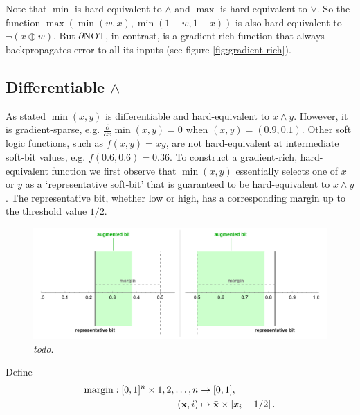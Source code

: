 \documentclass{article} %
\begin{document}
Note that $\operatorname{min}$ is hard-equivalent to $\wedge$ and $\operatorname{max}$ is hard-equivalent to $\vee$. So the function $\operatorname{max}(\operatorname{min}(w, x), \operatorname{min}(1-w, 1-x))$ is also hard-equivalent to $\neg(x \oplus w)$. But $\partial\text{NOT}$, in contrast, is a gradient-rich function that always backpropagates error to all its inputs (see figure \ref{fig:gradient-rich}).

\subsection{Differentiable $\wedge$}

As stated $\operatorname{min}(x, y)$ is differentiable and hard-equivalent to $x \wedge y$. However, it is gradient-sparse, e.g. $\frac{\partial}{\partial x} \operatorname{min}(x,y) = 0$ when $(x,y)=(0.9,0.1)$. Other soft logic functions, such as $f(x,y) = x y$, are not hard-equivalent at intermediate soft-bit values, e.g. $f(0.6, 0.6) = 0.36$. To construct a gradient-rich, hard-equivalent function we first observe that $\operatorname{min}(x,y)$ essentially selects one of $x$ or $y$ as a `representative soft-bit' that is guaranteed to be hard-equivalent to $x \wedge y$. The representative bit, whether low or high, has a corresponding margin up to the threshold value $1/2$.

\begin{figure}[t]
	\centering
	\includegraphics[width=1.0\textwidth]{margin-trick.png}
	\caption{{\em todo}.}
	\label{fig:margin-trick}
\end{figure}


Define 
\begin{equation*}
\begin{aligned}
\operatorname{margin}: [0,1]^{n} \times 1,2,\dots,n &\to [0,1],\\
({\bf x}, i) &\mapsto \bar{\bf x} \times \left|x_{i} - 1/2\right| \text{.}
\end{aligned}
\end{equation*}
\end{document}
